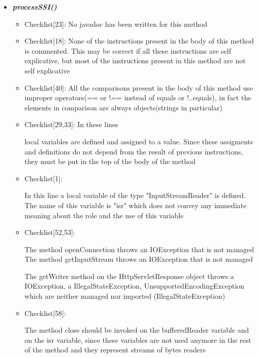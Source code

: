 \documentclass[11pt,titlepage]{article} %
\begin{document}
\begin{itemize}
   \item \textbf{\textit{processSSI()}}
    \begin{itemize}
     \item Checklist[23]: No javadoc has been written for this method
     \item Checklist[18]: None of the instructions present in the body of this method is commented. This may be
      correct if all these instructions are self explicative, but most of the instructions
      present in this method are not self explicative
     \item Checklist[40]: All the comparisons present in the body of this method use improper
      operators(== or !== instead of equals or !..equals), in fact the elements in comparison
      are always objects(strings in particular)
     \item Checklist[29,33]: In these lines
      
      
      local variables are defined and assigned to a value. Since these assigments and definitions
      do not depend from the result of previous instructions, they must be put in the top
      of the body of the method
     \item Checklist[1]:
      
      In this line a local variable of the type "InputStreamReader" is defined. The name of
      this variable is "isr" which does not convey any immediate meaning about the role and the
      use of this variable
     \item Checklist[52,53]:
      
      The method openConnection throws an IOException that is not managed\newline
      The method getInputStream throws an IOException that is not managed\newline\newline
      
      
      The getWriter method on the HttpServletResponse object throws a IOException, a IllegalStateException, UnsupportedEncodingException
      which are neither managed nor imported (IllegalStateException)
     \item Checklist[58]:
      
      The method close should be invoked on the bufferedReader variable and on the
      isr variable, since these variables are not used anymore in the rest of the method
      and they represent streams of bytes readers
    \end{itemize}

  \end{itemize}
\end{document}
